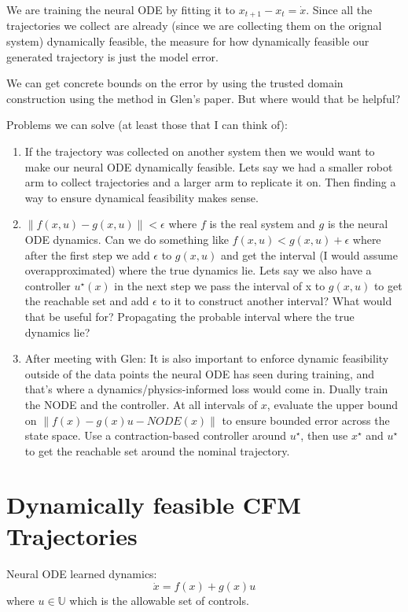 \documentclass[12pt]{article}
\begin{document}
We are training the neural ODE by fitting it to \(x_{t+1} - x_{t} = \dot{x}\). Since all the trajectories we collect are already  (since we are collecting them on the orignal system) dynamically feasible, the measure for how dynamically feasible our generated trajectory is just the model error. 

We can get concrete bounds on the error by using the trusted domain construction using the method in Glen's paper. But where would that be helpful?

Problems we can solve (at least those that I can think of):
\begin{enumerate}
    \item If the trajectory was collected on another system then we would want to make our neural ODE dynamically feasible. Lets say we had a smaller robot arm to collect trajectories and a larger arm to replicate it on. Then finding a way to ensure dynamical feasibility makes sense. 
    \item \(\|f(x,u) - g(x,u)\| < \epsilon\) where \(f\) is the real system and \(g\) is the neural ODE dynamics. Can we do something like \(f(x,u) < g(x,u) + \epsilon\) where after the first step we add \(\epsilon\) to \(g(x,u)\) and get the interval (I would assume overapproximated) where the true dynamics lie. Lets say we also have a controller \(u^{\star}(x)\) in the next step we pass the interval of x to \(g(x,u)\) to get the reachable set and add \(\epsilon\) to it to construct another interval? What would that be useful for? Propagating the probable interval where the true dynamics lie?
    \item After meeting with Glen: It is also important to enforce dynamic feasibility outside of the data points the neural ODE has seen during training, and that's where a dynamics/physics-informed loss would come in. Dually train the NODE and the controller. At all intervals of \(x\), evaluate the upper bound on \(\|f(x) - g(x)u - NODE(x)\|\) to ensure bounded error across the state space. Use a contraction-based controller around \(u^{\star}\), then use \(x^{\star}\) and \(u^{\star}\) to get the reachable set around the nominal trajectory.
\end{enumerate}

\section{Dynamically feasible CFM Trajectories}
Neural ODE learned dynamics:\[\dot{x} = f(x) + g(x)u\] where \(u \in \mathbb{U}\) which is the allowable set of controls. 
\end{document}
